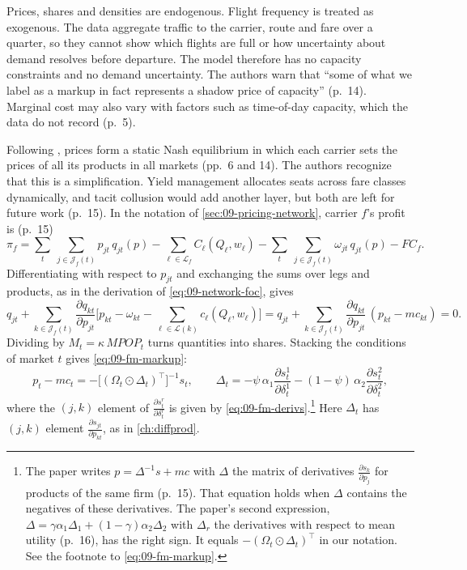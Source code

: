 Prices, shares and densities are endogenous. Flight frequency is treated as exogenous. The data aggregate
traffic to the carrier, route and fare over a quarter, so they cannot show which flights are full or how
uncertainty about demand resolves before departure. The model therefore has no capacity constraints and no
demand uncertainty. The authors warn that ``some of what we label as a markup in fact represents a shadow
price of capacity'' (p.~14). Marginal cost may also vary with factors such as time-of-day capacity, which
the data do not record (p.~5).

Following \citet{Berry1990}, prices form a static Nash equilibrium in which each carrier sets the prices of
all its products in all markets (pp.~6 and 14). The authors recognize that this is a simplification. Yield
management allocates seats across fare classes dynamically, and tacit collusion would add another layer,
but both are left for future work (p.~15). In the notation of \cref{sec:09-pricing-network}, carrier $f$'s
profit is (p.~15)
\begin{equation}\label{eq:09-bcs-profit}
\pi_f=\sum_t\ \sum_{j\in\mathcal{J}_f(t)}p_{jt}\,q_{jt}(p)-\sum_{\ell\in\mathcal{L}_f}C_\ell(Q_\ell,w_\ell)
-\sum_t\ \sum_{j\in\mathcal{J}_f(t)}\omega_{jt}\,q_{jt}(p)-FC_f .
\end{equation}
Differentiating with respect to $p_{jt}$ and exchanging the sums over legs and products, as in the
derivation of \eqref{eq:09-network-foc}, gives
\begin{equation}\label{eq:09-bcs-foc}
q_{jt}+\sum_{k\in\mathcal{J}_f(t)}\frac{\partial q_{kt}}{\partial p_{jt}}
\Big[p_{kt}-\omega_{kt}-\sum_{\ell\in\mathcal{L}(k)}c_\ell(Q_\ell,w_\ell)\Big]
=q_{jt}+\sum_{k\in\mathcal{J}_f(t)}\frac{\partial q_{kt}}{\partial p_{jt}}\,(p_{kt}-mc_{kt})=0 .
\end{equation}
Dividing by $M_t=\kappa\,\mathit{MPOP}_t$ turns quantities into shares. Stacking the conditions of market $t$
gives \eqref{eq:09-fm-markup}:
\begin{equation}\label{eq:09-bcs-markup}
p_t-mc_t=-\big[(\Omega_t\odot\Delta_t)^\top\big]^{-1}s_t,\qquad
\Delta_t=-\psi\,\alpha_1\frac{\partial s^1_t}{\partial\delta^1_t}-(1-\psi)\,\alpha_2\frac{\partial s^2_t}{\partial\delta^2_t},
\end{equation}
where the $(j,k)$ element of $\frac{\partial s^r_t}{\partial\delta^r_t}$ is given by
\eqref{eq:09-fm-derivs}.\footnote{The paper writes $p=\Delta^{-1}s+mc$ with $\Delta$ the matrix of
derivatives $\frac{\partial s_k}{\partial p_j}$ for products of the same firm (p.~15). That equation holds
when $\Delta$ contains the negatives of these derivatives. The paper's second expression,
$\Delta=\gamma\alpha_1\Delta_1+(1-\gamma)\alpha_2\Delta_2$ with $\Delta_r$ the derivatives with respect to
mean utility (p.~16), has the right sign. It equals $-(\Omega_t\odot\Delta_t)^\top$ in our notation. See
the footnote to \eqref{eq:09-fm-markup}.} Here $\Delta_t$ has $(j,k)$ element
$\frac{\partial s_{jt}}{\partial p_{kt}}$, as in \cref{ch:diffprod}.

